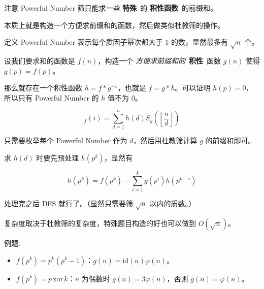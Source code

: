注意 Powerful Number 筛只能求一些 \textbf{特殊}\ 的 \textbf{积性函数}\ 的前缀和。

本质上就是构造一个方便求前缀和的函数，然后做类似杜教筛的操作。

定义 Powerful Number 表示每个质因子幂次都大于 $1$ 的数，显然最多有 $\sqrt n$ 个。

设我们要求和的函数是 $f(n)$，构造一个 \textit{方便求前缀和的}\ \textbf{积性}\ 函数 $g(n)$ 使得 $g(p) = f(p)$。

那么就存在一个积性函数 $h = f * g ^ {-1}$，也就是 $f = g *h$。可以证明 $h(p) = 0$，所以只有 Powerful Number 的 $h$ 值不为 $0$。

$$ _f(i) = \sum_{d = 1} ^ n h(d) S_g \left( \left\lfloor \frac n d \right\rfloor \right) $$

只需要枚举每个 Powerful Number 作为 $d$，然后用杜教筛计算 $g$ 的前缀和即可。

求 $h(d)$ 时要先预处理 $h(p^k)$，显然有

$$ h \left(p ^ k \right) = f \left(p ^ k \right) - \sum_{i = 1} ^ k g \left( p ^ i \right) h \left( p ^ {k - i} \right) $$

处理完之后 DFS 就行了。（显然只需要筛 $\sqrt n$ 以内的质数。）

复杂度取决于杜教筛的复杂度，特殊题目构造的好也可以做到 $O \left( \sqrt n \right)$。

例题:

\begin{itemize}
	\item $f \left( p ^ k \right) = p ^ k \left( p ^ k - 1 \right)$：$g(n) = \text{id}(n) \varphi(n)$。
	\item $f \left( p ^ k \right) = p \, \text{xor} \, k$：$n$ 为偶数时 $g(n) = 3 \varphi(n)$，否则 $g(n) = \varphi(n)$。
\end{itemize}
